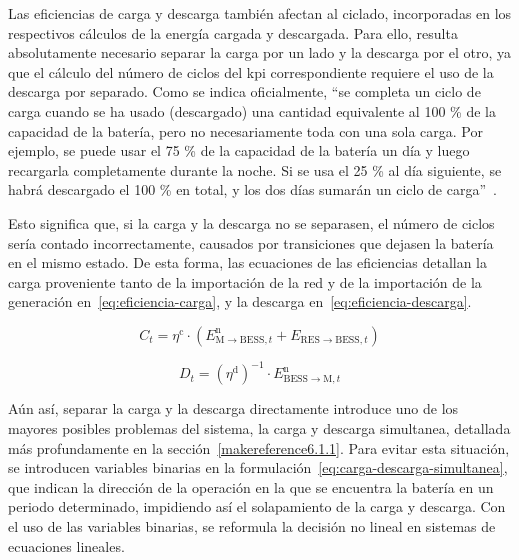 Las eficiencias de carga y descarga también afectan al ciclado, incorporadas en los respectivos cálculos de la energía cargada y descargada. Para ello, resulta absolutamente necesario separar la carga por un lado y la descarga por el otro, ya que el cálculo del número de ciclos del \gls{kpi} correspondiente requiere el uso de la descarga por separado. Como se indica oficialmente, ``se completa un ciclo de carga cuando se ha usado (descargado) una cantidad equivalente al 100 \% de la capacidad de la batería, pero no necesariamente toda con una sola carga. Por ejemplo, se puede usar el 75 \% de la capacidad de la batería un día y luego recargarla completamente durante la noche. Si se usa el 25 \% al día siguiente, se habrá descargado el 100 \% en total, y los dos días sumarán un ciclo de carga''~\cite{apple2025batteries}.

Esto significa que, si la carga y la descarga no se separasen, el número de ciclos sería contado incorrectamente, causados por transiciones que dejasen la batería en el mismo estado. De esta forma, las ecuaciones de las eficiencias detallan la carga proveniente tanto de la importación de la red y de la importación de la generación en~\ref{eq:eficiencia-carga}, y la descarga en~\ref{eq:eficiencia-descarga}.

\begin{equation}%
  \label{eq:eficiencia-carga}
  C_{t} = \eta^{\mathrm{c}} \cdot \left(E^{\mathrm{n}}_{\mathrm{M} \rightarrow \mathrm{BESS}, t} + E_{\mathrm{RES} \rightarrow \mathrm{BESS}, t}\right)
\end{equation}

\begin{equation}%
  \label{eq:eficiencia-descarga}
  D_{t} = {\left(\eta^{\mathrm{d}}\right)}^{-1} \cdot E^{\mathrm{n}}_{\mathrm{BESS} \rightarrow \mathrm{M}, t}
\end{equation}

Aún así, separar la carga y la descarga directamente introduce uno de los mayores posibles problemas del sistema, la carga y descarga simultanea, detallada más profundamente en la sección~\ref{makereference6.1.1}. Para evitar esta situación, se introducen variables binarias en la formulación~\ref{eq:carga-descarga-simultanea}, que indican la dirección de la operación en la que se encuentra la batería en un periodo determinado, impidiendo así el solapamiento de la carga y descarga. Con el uso de las variables binarias, se reformula la decisión no lineal en sistemas de ecuaciones lineales.

